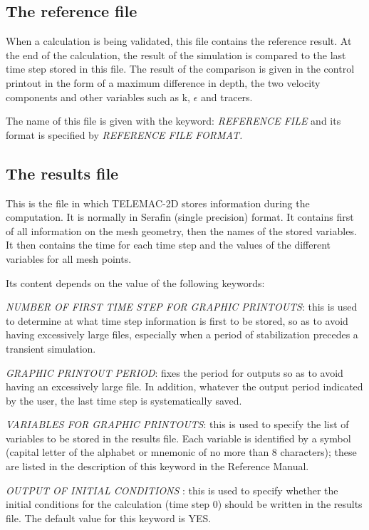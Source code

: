 \subsection{ The reference file}

 When a calculation is being validated, this file contains the reference result. At the end of the calculation, the result of the simulation is compared to the last time step stored in this file. The result of the comparison is given in the control printout in the form of a maximum difference in depth, the two velocity components and other variables such as k, $\epsilon$ and tracers.

 The name of this file is given with the keyword: \textit{REFERENCE FILE} and its format is specified by \textit{REFERENCE FILE FORMAT.}


\subsection{ The results file}

 This is the file in which TELEMAC-2D stores information during the computation. It is normally in Serafin (single precision) format. It contains first of all information on the mesh geometry, then the names of the stored variables. It then contains the time for each time step and the values of the different variables for all mesh points.

 Its content depends on the value of the following keywords:

 \textit{NUMBER OF FIRST TIME STEP FOR GRAPHIC PRINTOUTS}: this is used to determine at what time step information is first to be stored, so as to avoid having excessively large files, especially when a period of stabilization precedes a transient simulation.

 \textit{GRAPHIC PRINTOUT PERIOD}: fixes the period for outputs so as to avoid having an excessively large file. In addition, whatever the output period indicated by the user, the last time step is systematically saved.

 \textit{VARIABLES FOR GRAPHIC PRINTOUTS}: this is used to specify the list of variables to be stored in the results file. Each variable is identified by a symbol (capital letter of the alphabet or mnemonic of no more than 8 characters); these are listed in the description of this keyword in the Reference Manual.

 \textit{OUTPUT OF INITIAL CONDITIONS} : this is used to specify whether the initial conditions for the calculation (time step 0) should be written in the results file. The default value for this keyword is YES.

